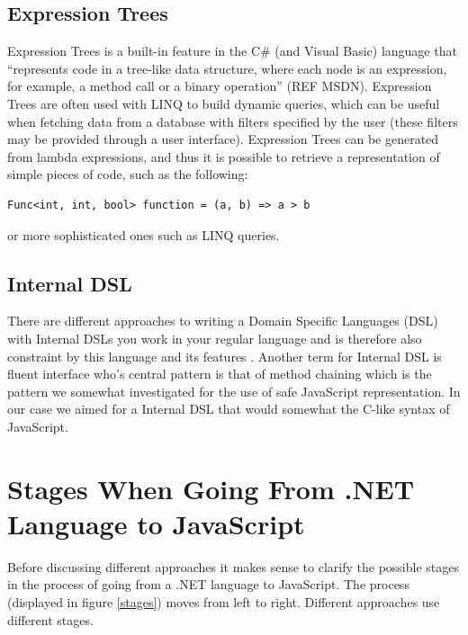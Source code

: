 
	\subsection{Expression Trees} %
	\label{ssub:expression_trees}
			Expression Trees is a built-in feature in the C\# (and Visual Basic) language that “represents code in a tree-like data structure, where each node is an expression, for example, a method call or a binary operation” (REF MSDN). Expression Trees are often used with LINQ to build dynamic queries, which can be useful when fetching data from a database with filters specified by the user (these filters may be provided through a user interface). Expression Trees can be generated from lambda expressions, and thus it is possible to retrieve a representation of simple pieces of code, such as the following:

			\begin{lstlisting}[language=CSharp,classoffset=1,morekeywords={Func}]
				Func<int, int, bool> function = (a, b) => a > b
			\end{lstlisting}

			or more sophisticated ones such as LINQ queries. 

	\subsection{Internal DSL} %
	\label{ssub:internal_dsl}
		There are different approaches to writing a Domain Specific Languages (DSL) with Internal DSLs you work in your regular language and is therefore also constraint by this language and its features \cite{domain_specific_languages}. Another term for Internal DSL is fluent interface who's central pattern is that of method chaining which is the pattern we somewhat investigated for the use of safe JavaScript representation. In our case we aimed for a Internal DSL that would somewhat the C-like syntax of JavaScript.

\section{Stages When Going From .NET Language to JavaScript} %
\label{sec:stages_when_going_from_net_language_to_javascript}
	Before discussing different approaches it makes sense to clarify the possible stages in the process of going from a .NET language to JavaScript. The process (displayed in figure \ref{stages}) moves from left to right. Different approaches use different stages.


